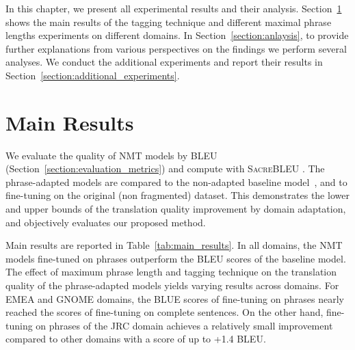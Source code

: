 In this chapter, we present all experimental results and their analysis.
Section~\ref{section:main_results} shows the main results of the tagging technique and different maximal phrase lengths experiments on different domains. In Section~\ref{section:anlaysis}, to provide further explanations from various perspectives on the findings we perform several analyses. We conduct the additional experiments and report their results in Section~\ref{section:additional_experiments}. 

\section{Main Results} \label{section:main_results}
We evaluate the quality of NMT models by BLEU (Section~\ref{section:evaluation_metrics}) and compute with \textsc{SacreBLEU} \parencite{post-2018-call}. The phrase-adapted models are compared to the non-adapted baseline model~\parencite{ng-etal-2019-facebook}, and to fine-tuning on the original (non fragmented) dataset. 
This demonstrates the lower and upper bounds of the translation quality improvement by domain adaptation, and objectively evaluates our proposed method. 

Main results are reported in Table~\ref{tab:main_results}. In all domains, the NMT models fine-tuned on phrases outperform the BLEU scores of the baseline model. 
The effect of maximum phrase length and tagging technique on the translation quality of the phrase-adapted models yields varying results across domains. For EMEA and GNOME domains, the BLUE scores of fine-tuning on phrases nearly reached the scores of fine-tuning on complete sentences. On the other hand, fine-tuning on phrases of the JRC domain achieves a relatively small improvement compared to other domains with a score of up to +1.4 BLEU. 

